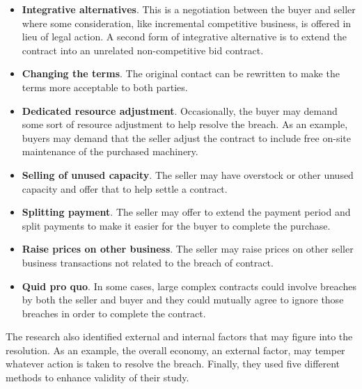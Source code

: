 \begin{itemize}
	\item \textbf{Integrative alternatives}. This is a negotiation between the buyer and seller where some consideration, like incremental competitive business, is offered in lieu of legal action. A second form of integrative alternative is to extend the contract into an unrelated non-competitive bid contract.
	\item \textbf{Changing the terms}. The original contact can be rewritten to make the terms more acceptable to both parties.
	\item \textbf{Dedicated resource adjustment}. Occasionally, the buyer may demand some sort of resource adjustment to help resolve the breach. As an example, buyers may demand that the seller adjust the contract to include free on-site maintenance of the purchased machinery.
	\item \textbf{Selling of unused capacity}. The seller may have overstock or other unused capacity and offer that to help settle a contract.
	\item \textbf{Splitting payment}. The seller may offer to extend the payment period and split payments to make it easier for the buyer to complete the purchase.
	\item \textbf{Raise prices on other business}. The seller may raise prices on other seller business transactions not related to the breach of contract.
	\item \textbf{Quid pro quo}. In some cases, large complex contracts could involve breaches by both the seller and buyer and they could mutually agree to ignore those breaches in order to complete the contract.
\end{itemize}

The research also identified external and internal factors that may figure into the resolution. As an example, the overall economy, an external factor, may temper whatever action is taken to resolve the breach. Finally, they used five different methods to enhance validity of their study.

